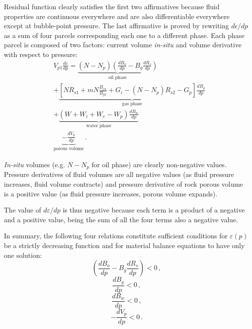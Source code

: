 \documentclass[authoryear,preprint,review,12pt]{elsarticle}
\begin{document}
Residual function clearly satisfies the first two affirmatives because fluid properties are continuous everywhere and are also differentiable everywhere except at bubble-point pressure.
The last affirmative is proved by rewriting $d\epsilon/dp$ as a sum of four parcels corresponding each one to a different phase. Each phase parcel is composed of two factors: current volume \textit{in-situ} and volume derivative with respect to pressure:
\begin{equation}
\begin{split}
&V_{p1}\frac{d\varepsilon}{dp}=\underbrace{\left(N-N_p\right) \left(\frac{dB_o}{dp} - B_g \frac{dR_s}{dp} \right)}_\text{oil phase}\\
&+\underbrace{\left[N R_{s1}+mN\frac{B_{o1}}{B_{g1}}+G_i-\left(N-N_p\right)R_{s2}-G_p\right] \frac{dB_g}{dp}}_\text{gas phase}\\
&+\underbrace{\left(W + W_i+W_e-W_p\right)\frac{dB_w}{dp}}_\text{water phase}\\
&\underbrace{-\frac{dV_p}{dp}}_\text{porous volume}\, .
\end{split}
\end{equation}

\textit{In-situ} volumes (e.g. $N-N_p$ for oil phase) are clearly non-negative values. Pressure derivatives of fluid volumes are all negative values (as fluid pressure increases, fluid volume contracts) and pressure derivative of rock porous volume is a positive value (as fluid pressure increases, porous volume expands).

The value of $d\varepsilon/dp$ is thus negative because each term is a product of a negative and a positive value, being the sum of all the four terms also a negative value.

In summary, the following four relations constitute sufficient conditions for $\varepsilon(p)$ be a strictly decreasing function and for material balance equations to have only one solution:
\begin{equation}\label{eq: PVTH1}
\left(\frac{dB_o}{dp} - B_g \frac{dR_s}{dp} \right) <0 \, ,
\end{equation}
\begin{equation}\label{eq: PVTH2}
\frac{dB_g}{dp} < 0 \, ,
\end{equation}
\begin{equation}\label{eq: PVTH3}
\frac{dB_w}{dp} < 0 \, ,
\end{equation}
\begin{equation}\label{eq: PVTH4}
-\frac{dV_p}{dp}<0 \, .
\end{equation}
\end{document}
